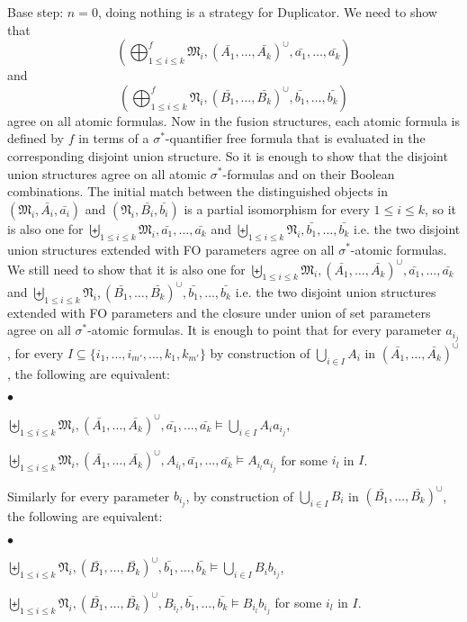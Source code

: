 \documentclass{LMCS}
\newcommand{\frM}{\mathfrak{M}}
\newcommand{\frN}{\mathfrak{N}}
\newcommand{\fo}{\textsf{FO}\xspace}
\begin{document}
Base step: $n=0$, doing nothing is a strategy for Duplicator. We
need to show that $$(\bigoplus_{1\leq i\leq k}^f
\frM_i,(\bar{A_1}, \ldots, \bar{A_k})^\cup,
\bar{a_1},\ldots,\bar{a_k})$$ and $$(\bigoplus_{ 1 \leq i
\leq k}^f \frN_i, (\bar{B_1},\ldots,\bar{B_k})^\cup,
\bar{b_1},\ldots,\bar{b_k})$$ agree on all atomic formulas. Now in
the fusion structures, each atomic formula is defined by $f$ in terms
of a $\sigma^*$-quantifier free formula that is evaluated in the
corresponding disjoint union structure. So it is enough to show that
the disjoint union structures agree on all atomic $\sigma^*$-formulas
and on their Boolean combinations. The initial match between the
distinguished objects in $(\frM_i, \bar{A_i},\bar{a_i})$ and
$(\frN_i, \bar{B_i},\bar{b_i})$ is a partial isomorphism for every
$1\leq i \leq k$, so it is also one for $\biguplus_{1 \leq
i \leq k} \frM_i, \bar{a_1},\ldots,\bar{a_k}$ and
$\biguplus_{1\leq i\leq k} \frN_i,
\bar{b_1},\ldots,\bar{b_k}$ i.e. the two disjoint union structures
extended with \fo parameters agree on all $\sigma^*$-atomic
formulas. We still need to show that it is also one for
$\biguplus_{1 \leq i \leq k} \frM_i, (\bar{A_1},
\ldots, \bar{A_k})^\cup,\bar{a_1},\ldots,\bar{a_k}$ and
$\biguplus_{1\leq i\leq k} \frN_i,(\bar{B_1},
\ldots, \bar{B_k})^\cup, \bar{b_1},\ldots,\bar{b_k}$ i.e. the two
disjoint union structures extended with \fo parameters and the
closure under union of set parameters agree on all
$\sigma^*$-atomic formulas. It is enough to point that for every
parameter $a_{i_j}$, for every $I \subseteq
\{i_1,\ldots,i_{m'},\ldots,k_1,k_{m'}\}$ by construction of
$\bigcup_{i \in I} A_i$ in $(\bar{A_1}, \ldots,
\bar{A_k})^\cup$, the following are equivalent:
\begin{iteMize}{$\bullet$}
\item $\biguplus_{1\leq i\leq k}
\frM_i,(\bar{A_1}, \ldots, \bar{A_k})^\cup,
\bar{a_1},\ldots,\bar{a_k} \models \bigcup_{i \in I} A_ia_{i_j}$,
\item   $\biguplus_{1\leq i\leq k} \frM_i,(\bar{A_1},
\ldots, \bar{A_k})^\cup, A_{i_l}, \bar{a_1},\ldots,\bar{a_k} \models
A_{i_l}a_{i_j}$ for some $i_l$ in $I$.
\end{iteMize}
Similarly for every parameter $b_{i_j}$, by construction of
$\bigcup_{i \in I} B_i$ in $(\bar{B_1}, \ldots,
\bar{B_k})^\cup$, the following are equivalent:
\begin{iteMize}{$\bullet$}
\item $\biguplus_{1\leq i\leq k}
\frN_i,(\bar{B_1}, \ldots, \bar{B_k})^\cup,
\bar{b_1},\ldots,\bar{b_k} \models \bigcup_{i \in I} B_ib_{i_j}$,
\item   $\biguplus_{1\leq i\leq k} \frN_i,(\bar{B_1},
\ldots, \bar{B_k})^\cup, B_{i_l}, \bar{b_1},\ldots,\bar{b_k} \models
B_{i_l}b_{i_j}$ for some $i_l$ in $I$.
\end{iteMize}
\end{document}
